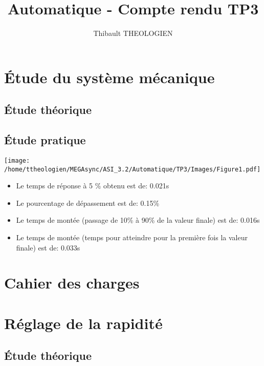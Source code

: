 \documentclass[a4paper,12pt]{article}
\title{Automatique - Compte rendu TP3}
\author{Thibault THEOLOGIEN}
\begin{document}
	\maketitle
	\tableofcontents
	\newpage

	\section{Étude du système mécanique}
		\subsection{Étude théorique}
			\newpage

		\subsection{Étude pratique}
			\begin{center}
				\texttt{[image: /home/ttheologien/MEGAsync/ASI\_3.2/Automatique/TP3/Images/Figure1.pdf]}
			\end{center}
			\begin{itemize}
				\item Le temps de réponse à 5 \% obtenu est de: 0.021s
				\item Le pourcentage de dépassement est de: 0.15\%
				\item Le temps de montée (passage de 10\% à 90\% de la valeur finale) est de: 0.016s
				\item Le temps de montée (temps pour atteindre pour la première fois la valeur finale) est de: 0.033s
			\end{itemize}
	\newpage

	\section{Cahier des charges}
		\newpage

	\section{Réglage de la rapidité}
		\subsection{Étude théorique}
			\newpage
\end{document}
